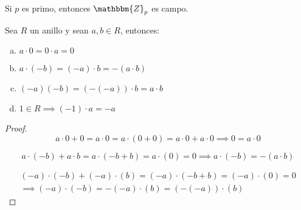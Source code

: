     \begin{corolario}
        Si $p$ es primo, entonces $\mathbbm{Z}_p$ es campo.
    \end{corolario}

    \begin{proposicion}
        Sea $R$ un anillo y sean $a, b \in R$, entonces:

        \begin{enumerate}[a)]
            \item $a \cdot 0 = 0 \cdot a = 0$
            \item $a \cdot (-b) = (-a) \cdot b = - (a \cdot b)$
            \item $(-a)(-b) = (-(-a)) \cdot b = a \cdot b$
            \item $1 \in R \implies (-1) \cdot a = -a$
        \end{enumerate}
    \end{proposicion}

    \begin{proof}
        \begin{equation*}
            a \cdot 0 + 0 = a \cdot 0 = a \cdot(0 + 0) = a \cdot 0 + a \cdot 0 \implies 0 = a \cdot 0
        \end{equation*}

        \begin{equation*}
            a \cdot (-b) + a \cdot b = a \cdot (-b + b) = a \cdot (0) = 0 \implies a \cdot (-b) = -(a \cdot b)
        \end{equation*}

        \begin{multline*}
            (-a) \cdot (-b) + (-a) \cdot (b) = (-a) \cdot (-b + b) = (-a) \cdot (0) = 0 \\
            \implies (-a) \cdot (-b) = -(-a) \cdot (b) = (-(-a)) \cdot (b)
        \end{multline*}
    \end{proof}
